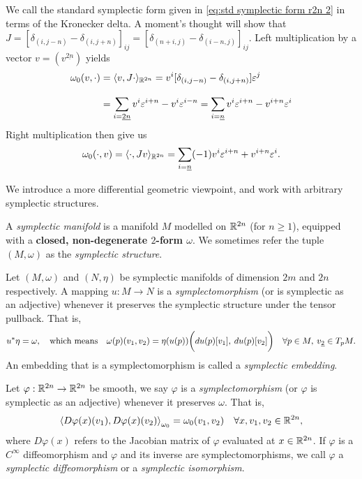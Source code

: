 \documentclass[../main-v2-manifolds.tex]{subfiles}
\begin{document}
%
%
\begin{note}\label{note: symplectic form summation computations}
    We call the standard symplectic form given in \cref{eq:std symplectic form r2n 2} in terms of the Kronecker delta. A moment's thought will show that $J = [\delta_{(i,j-n)} - \delta_{(i,j+n)}]_{ij} = [\delta_{(n+i,j)} - \delta_{(i-n,j)}]_{ij}$. Left multiplication by a vector $v = (v^{\underline{2n}})$ yields
    \begin{align*}
        \omega_0(v,\cdot) &= \langle v, J\cdot\rangle_{{\mathbb{R}^{2n}}} = v^i[\delta_{(i,j-n)} - \delta_{(i,j+n)}]\varepsilon^j\\[2ex]
        &=\sum_{i=\underline{2n}}v^i\varepsilon^{i+n} - v^i\varepsilon^{i-n} =\sum_{i=\underline{n}}v^i\varepsilon^{i+n} - v^{i+n}\varepsilon^{i}
    \end{align*}
    Right multiplication then give us 
    \[
        \omega_0(\cdot, v) = \langle \cdot,Jv\rangle_{{\mathbb{R}^{2n}}} = \sum_{i=\underline{n}}(-1)v^i\varepsilon^{i+n} + v^{i+n}\varepsilon^i.
    \]
\end{note}
We introduce a more differential geometric viewpoint, and work with arbitrary symplectic structures.
\begin{definition}\label{def:symplectic manifold}
    A \emph{symplectic manifold} is a manifold $M$ modelled on ${\mathbb{R}^{2n}}$ (for $n\geq 1$), equipped with a \textbf{closed, non-degenerate $2$-form $\omega$}. We sometimes refer the tuple $(M,\omega)$ as the \emph{symplectic structure}.
\end{definition}
\begin{definition}[Symplectomorphism]
    Let $(M,\omega)$ and $(N,\eta)$ be symplectic manifolds of dimension $2m$ and $2n$ respectively. A mapping $u: M\to N$ is a \emph{symplectomorphism} (or is symplectic as an adjective) whenever it preserves the symplectic structure under the tensor pullback. That is,
    \[
        u^*\eta =\omega,\qqtext{which means} \omega(p)(v_1,v_2) = \eta(u(p))\biggl(du(p)[v_1], \:du(p)[v_2]\biggr)\quad\forall p\in M,\: v_{\underline{2}}\in T_pM.
    \]
    An embedding that is a symplectomorphism is called a \emph{symplectic embedding}.
\end{definition}
\begin{example}
Let $\varphi:{\mathbb{R}^{2n}}\to{\mathbb{R}^{2n}}$ be smooth, we say $\varphi$ is a \emph{symplectomorphism} (or $\varphi$ is symplectic as an adjective) whenever it preserves $\omega$. That is,
\[
    \left\langle D\varphi(x)(v_1), D\varphi(x)(v_2)\right\rangle_{\omega_0} = \omega_0(v_1, v_2)\quad\forall x,v_1,v_2\in{\mathbb{R}^{2n}},
\]
where $D\varphi(x)$ refers to the Jacobian matrix of $\varphi$ evaluated at $x\in{\mathbb{R}^{2n}}$. If $\varphi$ is a $C^\infty$ diffeomorphism and $\varphi$ and its inverse are symplectomorphisms, we call $\varphi$ a \emph{symplectic diffeomorphism} or a \emph{symplectic isomorphism}.
\end{example}
\end{document}
